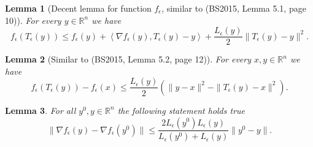 \documentclass[11pt]{article}
\numberwithin{equation}{section}
\newtheorem{lemma}{Lemma}[proposition]
\begin{document}
\begin{lemma}[Decent lemma for function $f_{\epsilon}$, similar to  (BS2015, Lemma 5.1, page 10)] For every $y \in \mathbb{R}^n$ we have
\begin{equation*}
	f_{\epsilon}(T_{\epsilon}(y)) \leq f_{\epsilon}(y) + \left\langle \nabla f_{\epsilon}(y), T_{\epsilon}(y) - y \right\rangle + \frac{L_{\epsilon}(y)}{2} \|T_{\epsilon}(y) - y\|^2 .
\end{equation*}
\end{lemma}

\begin{lemma} [Similar to  (BS2015, Lemma 5.2, page 12)] \label{StateEq64} 
For every $x,y \in \mathbb{R}^n$ we have
\begin{equation*}
	f_{\epsilon}(T_{\epsilon}(y)) - f_{\epsilon}(x) \leq \frac{L_{\epsilon}(y)}{2} \left( \|y-x\|^2 - \|T_{\epsilon}(y) - x\|^2 \right) .
\end{equation*}
\end{lemma}

\begin{lemma} \label{StateEq65}
 For all $y^0,y \in \mathbb{R}^n$ the following statement holds true
\begin{equation*}
	\| \nabla f_{\epsilon}(y) - \nabla f_{\epsilon}(y^0) \| \leq \frac{2L_{\epsilon}(y^0)L_{\epsilon}(y)}{L_{\epsilon}(y^0)+L_{\epsilon}(y)} \|y^0 - y\|.
\end{equation*}
\end{lemma}
\end{document}
